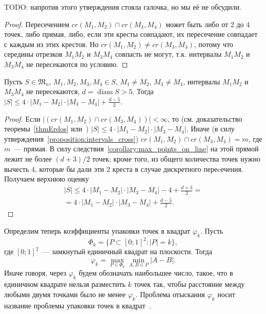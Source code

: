 TODO: напротив этого утверждения стояла галочка, но мы её не обсудили.

\begin{proof}
	Пересечением $cr(M_1,M_2) \cap cr(M_3,M_4)$ может быть либо от 2 до 4 точек, либо прямая,
	либо, если эти кресты совпадают, их пересечение совпадает с каждым из этих крестов.
	Но $cr(M_1,M_2) \neq cr(M_3,M_4)$, потому что середины отрезков $M_1 M_2$ и $M_3 M_4$
	совпасть не могут, т.к. интервалы $M_1 M_2$ и $M_3 M_4$ не пересекаются по условию.
\end{proof}

\begin{lemma}
	\label{lemma_preliminary_size}
	Пусть $S\in\mathfrak{M}_n$,
	$M_1, M_2, M_3, M_4 \in S$,
	$M_1 \neq M_2$, $M_3 \neq M_4$,
	интервалы $M_1 M_2$ и $M_3 M_4$ не пересекаются,
	$d = \operatorname{diam} S > 5$.
	Тогда $|S| \leq 4 \cdot |M_1 - M_2| \cdot |M_3 - M_4| + \frac{d-5}{2}$.
\end{lemma}

\begin{proof}
	Если $|(cr(M_1, M_2) \cap cr(M_3, M_4))| < \infty$,
	то (см. доказательство теоремы~\ref{thmErdos} или~\cite[часть 2, неравенство (1)]{solymosi2003note})
	$|S| \leq 4 \cdot |M_1 - M_2| \cdot |M_3 - M_4|$.
	Иначе (в силу утверждения~\ref{proposition:intervals_cross}) $cr(M_1, M_2) \cap cr(M_3, M_4) = m$,
	где $m$~--- прямая.
	В силу следствия~\ref{corollary:max_points_on_line} на этой прямой лежит не более $(d+3)/2$ точек;
	кроме того, из общего количества точек нужно вычесть 4,
	которые бы дали эти 2 креста в случае дискретного переcечения.
	Получаем верхнюю оценку
	\begin{multline}
		|S| \leq 4 \cdot |M_1 - M_2| \cdot |M_3 - M_4| - 4 + \frac{d+3}{2}
		=
		\\=
		4 \cdot |M_1 - M_2| \cdot |M_3 - M_4| + \frac{d-5}{2}
		.
	\end{multline}
\end{proof}

Определим теперь коэффициенты упаковки точек в квадрат $\varphi_k$.
Пусть
\begin{equation*}
	\Phi_k = \{ P \subset [0;1]^2 : |P|=k\}
	,
\end{equation*}
где $[0;1]^2$~--- замкнутый единичный квадрат на плоскости.
Тогда
\begin{equation*}
	\varphi_k = \max_{P \in \Phi_k} \min_{A,B \in P} |A - B|
	.
\end{equation*}
Иначе говоря, через $\varphi_k$ будем обозначать наибольшее число, такое,
что в единичном квадрате нельзя разместить $k$ точек так,
чтобы расстояние между любыми двумя точками было не менее $\varphi_k$.
Проблема отыскания $\varphi_k$ носит название проблемы упаковки точек в квадрат~\cite{locatelli2002packing,costa2013valid}.

